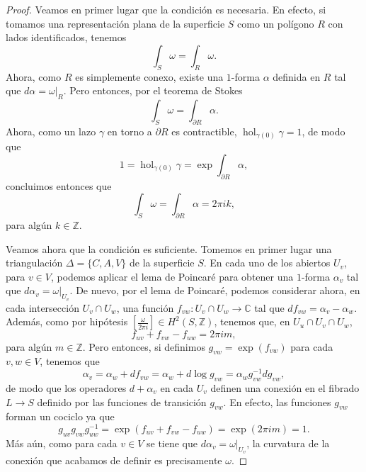 \documentclass[12pt,a4paper]{article}
\theoremstyle{definition} \newtheorem{defn}[thm]{Definición}
\theoremstyle{definition} \newtheorem{ejemplo}[thm]{Ejemplo}
\theoremstyle{definition} \newtheorem{ejercicio}[thm]{Ejercicio}
\def\CC{\mathbb{C}}
\DeclareMathOperator{\hol}{hol}
\begin{document}
\begin{proof}
 Veamos en primer lugar que la condición es necesaria. En efecto, si tomamos una representación plana de la superficie $S$ como un polígono $R$ con lados identificados, tenemos
 \begin{equation*}
   \int_S \omega = \int_R \omega. 
 \end{equation*}
 Ahora, como $R$ es simplemente conexo, existe una $1$-forma $\alpha$ definida en $R$ tal que $d\alpha = \omega|_R$. Pero entonces, por el teorema de Stokes
 \begin{equation*}
   \int_S \omega = \int_{\partial R} \alpha.
 \end{equation*}
 Ahora, como un lazo $\gamma$ en torno a $\partial R$ es contractible, $\hol_{\gamma(0)} \gamma = 1$, de modo que
 \begin{equation*}
   1=\hol_{\gamma(0)} \gamma = \exp \int_{\partial R} \alpha,
 \end{equation*}
 concluimos entonces que
 \begin{equation*}
   \int_S \omega = \int_{\partial R} \alpha = 2\pi i k,
 \end{equation*}
 para algún $k\in \mathbb{Z}$.

 Veamos ahora que la condición es suficiente. Tomemos en primer lugar una triangulación $\Delta=\{C,A,V\}$ de la superficie $S$. En cada uno de los abiertos $U_v$, para $v\in V$, podemos aplicar el lema de Poincaré para obtener una $1$-forma $\alpha_v$ tal que $d\alpha_v = \omega|_{U_v}$. De nuevo, por el lema de Poincaré, podemos considerar ahora, en cada intersección $U_v \cap U_w$, una función $f_{vw}: U_v \cap U_w \rightarrow \CC$ tal que $df_{vw} = \alpha_v - \alpha_w$. Además, como por hipótesis $[\tfrac{\omega}{2\pi i}] \in H^2(S,\mathbb{Z})$, tenemos que, en $U_u \cap U_v \cap U_w$,
 \begin{equation*}
   f_{uv} + f_{vw} - f_{uw} = 2\pi i m,
 \end{equation*}
 para algún $m\in \mathbb{Z}$. Pero entonces, si definimos $g_{vw}= \exp(f_{vw})$ para cada $v,w \in V$, tenemos que
 \begin{equation*}
   \alpha_v = \alpha_w + df_{vw} = \alpha_w + d\log g_{vw} = \alpha_w g_{vw}^{-1} d g_{vw},
 \end{equation*}
 de modo que los operadores $d+\alpha_v$ en cada $U_v$ definen una conexión en el fibrado $L\rightarrow S$ definido por las funciones de transición $g_{vw}$. En efecto, las funciones $g_{vw}$ forman un cociclo ya que
 \begin{equation*}
   g_{uv}g_{vw}g_{uw}^{-1} = \exp(f_{uv} + f_{vw} - f_{uw} ) = \exp (2\pi i m) = 1.
 \end{equation*}
 Más aún, como para cada $v\in V$ se tiene que $d\alpha_v = \omega|_{U_v}$, la curvatura de la conexión que acabamos de definir es precisamente $\omega$.
\end{proof}
\end{document}
